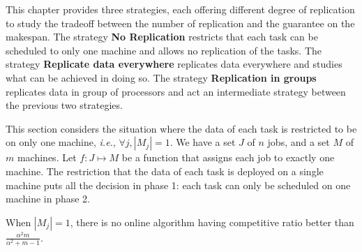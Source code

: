 \label{ch4}
\label{Intro}
This chapter provides three strategies,  each offering different degree of replication to study the tradeoff between the number of replication and the guarantee on the makespan.  The strategy \textbf{No Replication} restricts that each task can be scheduled to only one machine and  allows no replication of the tasks.  The strategy \textbf{Replicate data everywhere} replicates data everywhere and studies what can be achieved in doing so. The strategy \textbf{Replication in groups} replicates data in group of  processors and  act an intermediate strategy  between the previous two strategies. 


This section considers the situation where the data of each task is
restricted to be on only one machine, {\em i.e.}, $\forall j, |M_j|=1$.  We
have a set $J$ of $ n$ jobs, and a set $M$ of $m$ machines.  Let $f :
J \mapsto M$ be a function that assigns each job to exactly one
machine. The restriction that the data of each task is deployed on a
single machine puts all the decision in phase 1: each task can only be
scheduled on one machine in phase 2.

\begin{theorem}
\label{th:model1-lb}
  When $|M_j| = 1$, there is no online algorithm having competitive
  ratio better than $\frac{\alpha^{2}m }{\alpha^{2} + m-1}$.
\end{theorem}
 
